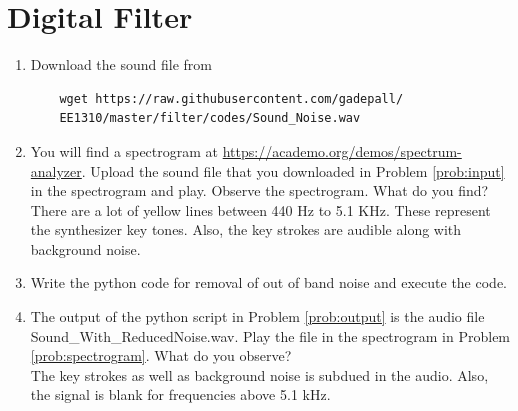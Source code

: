 \documentclass[journal,12pt,twocolumn]{IEEEtran}
\renewcommand\thesection{\arabic{section}}
\begin{document}
\section{Digital Filter}
\begin{enumerate}[label=\thesection.\arabic*
,ref=\thesection.\theenumi]
\item
\label{prob:input}
Download the sound file from  
\begin{lstlisting}
	wget https://raw.githubusercontent.com/gadepall/ 
	EE1310/master/filter/codes/Sound_Noise.wav
\end{lstlisting}
\item
\label{prob:spectrogram}
You will find a spectrogram at \href{https://academo.org/demos/spectrum-analyzer}{\url{https://academo.org/demos/spectrum-analyzer}}. 
%
Upload the sound file that you downloaded in Problem \ref{prob:input} in the spectrogram  and play.  Observe the spectrogram. What do you find?
\\
%
\solution There are a lot of yellow lines between 440 Hz to 5.1 KHz.  These represent the synthesizer key tones. Also, the key strokes
are audible along with background noise.
\item
\label{prob:output}
Write the python code for removal of out of band noise and execute the code.
\\
\solution
%
%
\item
The output of the python script in Problem \ref{prob:output} is the audio file Sound\_With\_ReducedNoise.wav. Play the file in the spectrogram in Problem \ref{prob:spectrogram}. What do you observe?
\\
\solution The key strokes as well as background noise is subdued in the audio.  Also,  the signal is blank for frequencies above 5.1 kHz.
\end{enumerate}
\end{document}
